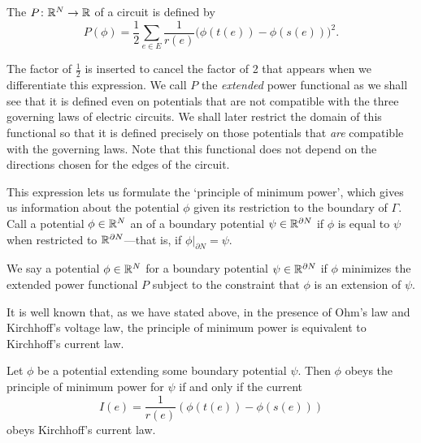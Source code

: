 \begin{definition}
The  $P{\colon} {\mathbb{R}}^N \to {\mathbb{R}}$ of a circuit is
defined by
\[
P(\phi) =\frac{1}{2} \sum_{e \in E} \frac{1}{r(e)}\big(\phi(t(e))-\phi(s(e))\big)^2.
\]
\end{definition}

\noindent
The factor of $\frac{1}{2}$ is inserted to cancel the factor of 2 that appears when
we differentiate this expression.  We call $P$ the \emph{extended} power functional as we shall see that it is defined even on potentials that are not compatible with the three governing laws of electric circuits. We shall later restrict the domain of this functional so that it is defined precisely on those potentials that \emph{are} compatible with the
governing laws. Note that this functional does not depend on the directions
chosen for the edges of the circuit.

This expression lets us formulate the `principle of minimum power', which gives
us information about the potential $\phi$ given its restriction to the boundary
of $\Gamma$. Call a potential $\phi \in {\mathbb{R}}^N$ an  of a
boundary potential $\psi \in {\mathbb{R}}^{\partial N}$ if $\phi$ is equal to $\psi$ when
restricted to ${\mathbb{R}}^{\partial N}$---that is, if $\phi|_{\partial N} = \psi$. 

\begin{definition}
We say a potential $\phi \in {\mathbb{R}}^{N}$  for a boundary potential $\psi \in {\mathbb{R}}^{\partial N}$ if $\phi$ minimizes
the extended power functional $P$ subject to the constraint that  $\phi$ is an
extension of $\psi$. 
\end{definition}

It is well known that, as we have stated above, in the presence of Ohm's law and
Kirchhoff's voltage law, the principle of minimum power is equivalent to
Kirchhoff's current law.

\begin{proposition} \label{minimum_power_implies_kirchhoff_current}
Let $\phi$ be a potential extending some boundary potential $\psi$. Then $\phi$
obeys the principle of minimum power for $\psi$ if and only if the 
current 
\[  I(e) = \frac1{r(e)}(\phi(t(e))-\phi(s(e))) \] 
obeys Kirchhoff's current law.
\end{proposition}

